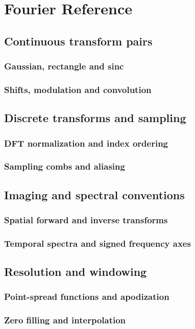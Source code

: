 \chapter{Fourier Reference}
\label{app:b}

\section{Continuous transform pairs}
\label{sec:b:continuous-transform-pairs}
\subsection{Gaussian, rectangle and sinc}
\subsection{Shifts, modulation and convolution}

\section{Discrete transforms and sampling}
\label{sec:b:discrete-transforms-and-sampling}
\subsection{DFT normalization and index ordering}
\subsection{Sampling combs and aliasing}

\section{Imaging and spectral conventions}
\label{sec:b:imaging-and-spectral-conventions}
\subsection{Spatial forward and inverse transforms}
\subsection{Temporal spectra and signed frequency axes}

\section{Resolution and windowing}
\label{sec:b:resolution-and-windowing}
\subsection{Point-spread functions and apodization}
\subsection{Zero filling and interpolation}
